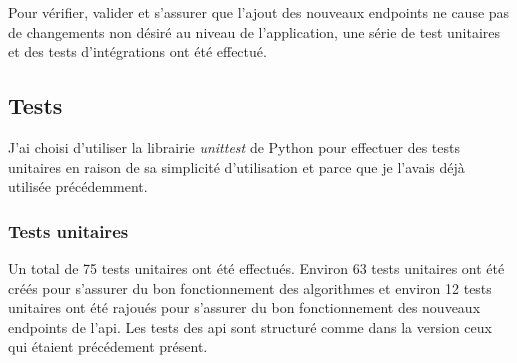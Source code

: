 \documentclass[11pt]{article}
\begin{document}
Pour vérifier, valider et s'assurer que l'ajout des nouveaux endpoints ne cause pas de changements non désiré au niveau de l'application, une série de test unitaires et des tests d’intégrations ont été effectué. 

\subsection{Tests}
J'ai choisi d'utiliser la librairie \textit{unittest} de Python pour effectuer des tests unitaires en raison de sa simplicité d'utilisation et parce que je l'avais déjà utilisée précédemment.

\subsubsection{Tests unitaires}
Un total de 75 tests unitaires ont été effectués. Environ 63 tests unitaires ont été créés pour s'assurer du bon fonctionnement des algorithmes et environ 12 tests unitaires ont été rajoués pour s'assurer du bon fonctionnement des nouveaux endpoints de l'api. Les tests des api sont structuré comme dans la version ceux qui étaient précédement présent.\\
\end{document}
